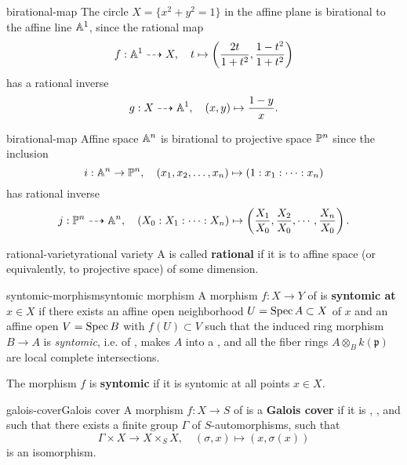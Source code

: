 \begin{example}{birational-map}
    The circle $X = \{ x^2 + y^2 = 1 \}$ in the affine plane is birational to the affine line $\AA^1$, since the rational map
    \[ f : \AA^1 \dashrightarrow X, \quad t \mapsto \left(\frac{2t}{1 + t^2}, \frac{1 - t^2}{1 + t^2}\right) \]
    has a rational inverse
    \[ g : X \dashrightarrow \AA^1, \quad (x, y) \mapsto \frac{1 - y}{x} . \]
\end{example}

\begin{example}{birational-map}
    Affine space $\AA^n$ is birational to projective space $\PP^n$ since the inclusion
    \[ i : \AA^n \to \PP^n, \quad (x_1, x_2, \ldots, x_n) \mapsto (1 : x_1 : \cdots : x_n) \]
    has rational inverse
    \[ j : \PP^n \dashrightarrow \AA^n, \quad (X_0 : X_1 : \cdots : X_n) \mapsto \left(\frac{X_1}{X_0}, \frac{X_2}{X_0}, \cdots, \frac{X_n}{X_0}\right) . \]
\end{example}

\begin{topic}{rational-variety}{rational variety}
    A  is called \textbf{rational} if it is  to affine space (or equivalently, to projective space) of some dimension.
\end{topic}

\begin{topic}{syntomic-morphism}{syntomic morphism}
    A morphism $f : X \to Y$ of  is \textbf{syntomic at $x \in X$} if there exists an affine open neighborhood $U = \Spec A \subset X$ of $x$ and an affine open $V = \Spec B$ with $f(U) \subset V$ such that the induced ring morphism $B \to A$ is \textit{syntomic}, i.e. of , makes $A$ into a  , and all the fiber rings $A \otimes_B k(\mathfrak{p})$ are local complete intersections.
    
    The morphism $f$ is \textbf{syntomic} if it is syntomic at all points $x \in X$.
\end{topic}

\begin{topic}{galois-cover}{Galois cover}
    A morphism $f : X \to S$ of  is a \textbf{Galois cover} if it is , , and such that there exists a finite group $\Gamma$ of $S$-automorphisms, such that
    \[ \Gamma \times X \to X \times_S X, \quad (\sigma, x) \mapsto (x, \sigma(x)) \]
    is an isomorphism.
\end{topic}

